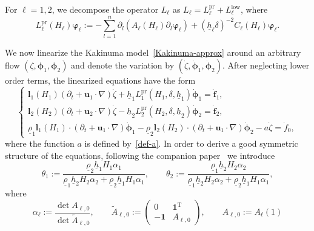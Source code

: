 \documentclass[11pt,leqno]{article}
\numberwithin{equation}{section}
\numberwithin{figure}{section}
\begin{document}
%
For $\ell=1,2$, we decompose the operator $L_\ell$ as $L_\ell=L_\ell^\mathrm{pr}+L_\ell^\mathrm{low}$, where 
%
\begin{equation}\label{del-A-principal}
L_\ell^\mathrm{pr}(H_\ell)\bm{\varphi}_\ell := -\sum_{l=1}^n\partial_l(A_\ell(H_\ell)\partial_l\bm{\varphi}_\ell)
 + (\underline{h}_\ell\delta)^{-2}C_\ell(H_\ell)\bm{\varphi}_\ell. 
\end{equation}


We now linearize the Kakinuma model~\eqref{Kakinuma-approx} around an arbitrary flow $(\zeta,\bm{\phi}_1,\bm{\phi}_2)$ 
and denote the variation by $(\dot{\zeta},\dot{\bm{\phi}}_1,\dot{\bm{\phi}}_2)$. 
After neglecting lower order terms, the linearized equations have the form 
%
\begin{equation}\label{linear-Kakinuma}
\begin{cases}
 \displaystyle
 {\bm l}_1(H_1)(\partial_t+\bm{u}_1\cdot\nabla)\dot{\zeta}
  + \underline{h}_1 L_1^\mathrm{pr}(H_1,\delta,\underline{h}_1)\dot{\bm{\phi}}_1 = \dot{{\bm f}}_1, \\
 \displaystyle
 {\bm l}_2(H_2)(\partial_t+\bm{u}_2\cdot\nabla)\dot{\zeta}
  - \underline{h}_2 L_2^\mathrm{pr}(H_2,\delta,\underline{h}_2)\dot{\bm{\phi}}_2 = \dot{{\bm f}}_2, \\
 \underline{\rho}_1{\bm l}_1(H_1)\cdot( \partial_t+\bm{u}_1\cdot\nabla )\dot{\bm{\phi}}_1 
  - \underline{\rho}_2{\bm l}_2(H_2)\cdot( \partial_t+\bm{u}_1\cdot\nabla )\dot{\bm{\phi}}_2 
  - a\dot{\zeta} = \dot{f}_0,
\end{cases}
\end{equation}
%
where the function $a$ is defined by~\eqref{def-a}. 
In order to derive a good symmetric structure of the equations, following the companion paper~\cite{DucheneIguchi2020} 
we introduce 
%
\begin{equation}\label{def-theta}
\theta_1 := \frac{\underline{\rho}_2\underline{h}_1H_1 \alpha_1}{
  \underline{\rho}_1\underline{h}_2H_2 \alpha_2 + \underline{\rho}_2\underline{h}_1H_1 \alpha_1}, \qquad
\theta_2 := \frac{\underline{\rho}_1\underline{h}_2H_2 \alpha_2}{
  \underline{\rho}_1\underline{h}_2H_2 \alpha_2 + \underline{\rho}_2\underline{h}_1H_1 \alpha_1},
\end{equation}
%
where
%
\begin{equation}\label{def-alpha}
\alpha_\ell := \frac{\det A_{\ell,0}}{\det \tilde{A}_{\ell,0}}, \qquad
\tilde{A}_{\ell,0} := 
\begin{pmatrix}
 0 & \bm{1}^\mathrm{T} \\
 -\bm{1} & A_{\ell,0}
\end{pmatrix}, \qquad
A_{\ell,0} := A_\ell(1)
\end{equation}
\end{document}
